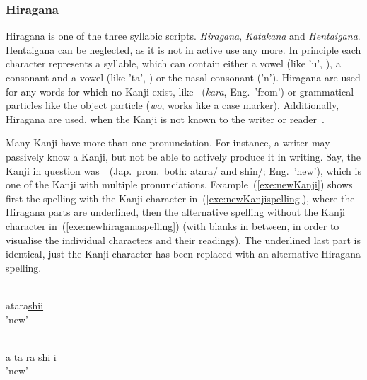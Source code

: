 \subsubsection{Hiragana }
\label{sec:hiragana}

Hiragana is one of the three syllabic scripts. \emph{Hiragana}, \emph{Katakana} 
and \emph{Hentaigana}. Hentaigana can be neglected, as it is not in active use 
any more. %
In principle each character represents a syllable, which can contain either a 
vowel (like 'u', ), a consonant and a vowel (like 'ta', ) or the 
nasal consonant  ('n').
Hiragana are used for any words for which no Kanji exist, like 
~(\emph{kara}, Eng.\ 'from') or grammatical particles like the object 
particle  (\emph{wo}, works like a case marker).
Additionally, Hiragana are used, when the Kanji is not known to the writer or 
reader~. 

Many Kanji have more than one pronunciation.
For instance, a writer may passively know a Kanji, but not be able to actively 
produce it in writing. Say, the Kanji in question was~~(Jap.\ pron.\ 
both: atara/ and shin/; Eng.\ 'new'), which is one of the 
Kanji with multiple pronunciations.
Example~(\ref{exe:newKanji})
shows first the spelling with the Kanji character 
in~(\ref{exe:newKanjispelling}), where the Hiragana parts are underlined,
then the alternative spelling without the Kanji character 
in~(\ref{exe:newhiraganaspelling}) (with blanks in between, in order to visualise
the individual characters and their readings). The underlined last part is 
identical, just the Kanji character has been replaced with an alternative 
Hiragana spelling.
\begin{exe}
\ex \label{exe:newKanji}
\begin{xlist}
\ex \label{exe:newKanjispelling}
\gll {}\underline{} \\
atara\underline{shii} \\
\trans 'new'

\ex \label{exe:newhiraganaspelling}
\gll {}   \underline{} \underline{} \\
a ta ra \underline{shi} \underline{i} \\
\trans 'new'
\end{xlist}
\end{exe}

